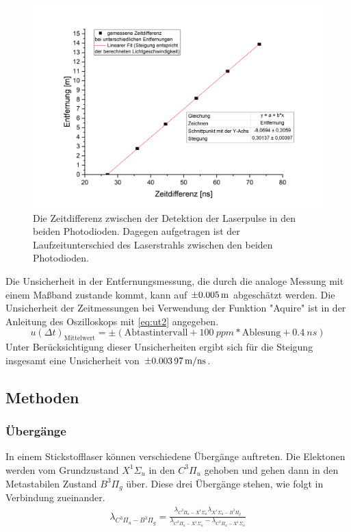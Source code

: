 \documentclass[
	a4paper,
	12pt,
	pagesize,
	ngerman
]{scrartcl}
\begin{document}
\begin{figure}[ht!]
	\centering
	\includegraphics[scale=0.6]{lichtgeschwindigkeit.png}
	\caption{Die Zeitdifferenz zwischen der Detektion der Laserpulse in den beiden Photodioden. Dagegen aufgetragen ist der Laufzeitunterschied des Laserstrahls zwischen den beiden Photodioden.}
	\label{lichtgeschwindigkeit}
\end{figure}

Die Unsicherheit in der Entfernungsmessung, die durch die analoge Messung mit einem Maßband zustande kommt, kann auf $\SI{\pm0,005}{m}$ abgeschätzt werden. Die Unsicherheit der Zeitmessungen bei Verwendung der Funktion "Aquire" ist in der Anleitung des Oszilloskops mit \cref{eq:ut2} angegeben.
\begin{equation}
	u(\Delta t)_\text{Mittelwert} = \pm(\text{Abtastintervall} + \SI{100}{ppm} * \text{Ablesung} + \SI{0,4}{ns})
	\label{eq:ut2}
\end{equation}
Unter Berücksichtigung dieser Unsicherheiten ergibt sich für die Steigung insgesamt eine Unsicherheit von $\SI{\pm0,00397}{m/ns}$.

\subsection{Methoden}
\subsubsection{Übergänge}
In einem Stickstofflaser können verschiedene Übergänge auftreten. Die Elektonen werden vom Grundzustand $X^1\Sigma_u$ in den $C^3\Pi_u$ gehoben und gehen dann in den Metastabilen Zustand $B^3\Pi_g$ über. Diese drei Übergänge stehen, wie folgt in Verbindung zueinander.
\begin{align}
    \lambda_{C^3\Pi_u-B^3\Pi_g} =  \frac{\lambda_{C^3\Pi_u-X^1\Sigma_u}\lambda_{X^1\Sigma_u-B^3\Pi_g}}{\lambda_{C^3\Pi_u-X^1\Sigma_u}-\lambda_{C^3\Pi_u-X^1\Sigma_u}} 
\end{align}
\end{document}
